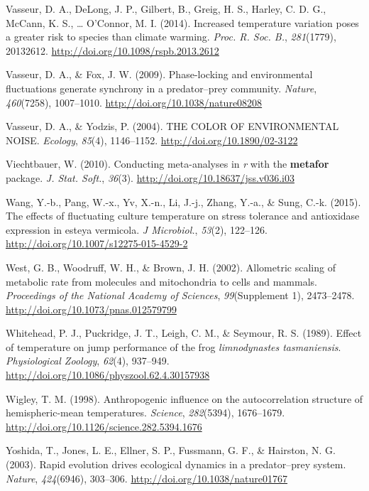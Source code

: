 \documentclass[12pt,twoside]{reedthesis}
\begin{document}
\leavevmode\hypertarget{ref-vasseur_increased_2014}{}%
Vasseur, D. A., DeLong, J. P., Gilbert, B., Greig, H. S., Harley, C. D. G., McCann, K. S., \ldots{} O'Connor, M. I. (2014). Increased temperature variation poses a greater risk to species than climate warming. \emph{Proc. R. Soc. B.}, \emph{281}(1779), 20132612. \url{http://doi.org/10.1098/rspb.2013.2612}

\leavevmode\hypertarget{ref-vasseur_phase-locking_2009}{}%
Vasseur, D. A., \& Fox, J. W. (2009). Phase-locking and environmental fluctuations generate synchrony in a predator--prey community. \emph{Nature}, \emph{460}(7258), 1007--1010. \url{http://doi.org/10.1038/nature08208}

\leavevmode\hypertarget{ref-vasseur_color_2004}{}%
Vasseur, D. A., \& Yodzis, P. (2004). THE COLOR OF ENVIRONMENTAL NOISE. \emph{Ecology}, \emph{85}(4), 1146--1152. \url{http://doi.org/10.1890/02-3122}

\leavevmode\hypertarget{ref-viechtbauer_conducting_2010}{}%
Viechtbauer, W. (2010). Conducting meta-analyses in \emph{r} with the \textbf{metafor} package. \emph{J. Stat. Soft.}, \emph{36}(3). \url{http://doi.org/10.18637/jss.v036.i03}

\leavevmode\hypertarget{ref-wang_effects_2015}{}%
Wang, Y.-b., Pang, W.-x., Yv, X.-n., Li, J.-j., Zhang, Y.-a., \& Sung, C.-k. (2015). The effects of fluctuating culture temperature on stress tolerance and antioxidase expression in esteya vermicola. \emph{J Microbiol.}, \emph{53}(2), 122--126. \url{http://doi.org/10.1007/s12275-015-4529-2}

\leavevmode\hypertarget{ref-west_allometric_2002}{}%
West, G. B., Woodruff, W. H., \& Brown, J. H. (2002). Allometric scaling of metabolic rate from molecules and mitochondria to cells and mammals. \emph{Proceedings of the National Academy of Sciences}, \emph{99}(Supplement 1), 2473--2478. \url{http://doi.org/10.1073/pnas.012579799}

\leavevmode\hypertarget{ref-whitehead_effect_1989}{}%
Whitehead, P. J., Puckridge, J. T., Leigh, C. M., \& Seymour, R. S. (1989). Effect of temperature on jump performance of the frog \emph{limnodynastes tasmaniensis}. \emph{Physiological Zoology}, \emph{62}(4), 937--949. \url{http://doi.org/10.1086/physzool.62.4.30157938}

\leavevmode\hypertarget{ref-wigley_anthropogenic_1998-1}{}%
Wigley, T. M. (1998). Anthropogenic influence on the autocorrelation structure of hemispheric-mean temperatures. \emph{Science}, \emph{282}(5394), 1676--1679. \url{http://doi.org/10.1126/science.282.5394.1676}

\leavevmode\hypertarget{ref-yoshida_rapid_2003}{}%
Yoshida, T., Jones, L. E., Ellner, S. P., Fussmann, G. F., \& Hairston, N. G. (2003). Rapid evolution drives ecological dynamics in a predator--prey system. \emph{Nature}, \emph{424}(6946), 303--306. \url{http://doi.org/10.1038/nature01767}


\end{document}
